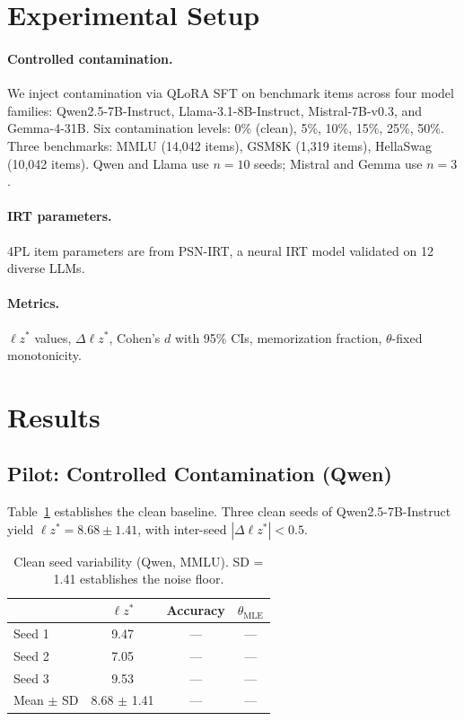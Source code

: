 \documentclass[11pt,a4paper]{article}
\begin{document}
\section{Experimental Setup}
\label{sec:setup}

\paragraph{Controlled contamination.}
We inject contamination via QLoRA SFT on benchmark items across four model families: Qwen2.5-7B-Instruct, Llama-3.1-8B-Instruct, Mistral-7B-v0.3, and Gemma-4-31B.
Six contamination levels: 0\% (clean), 5\%, 10\%, 15\%, 25\%, 50\%.
Three benchmarks: MMLU (14,042 items), GSM8K (1,319 items), HellaSwag (10,042 items).
Qwen and Llama use $n{=}10$ seeds; Mistral and Gemma use $n{=}3$.

\paragraph{IRT parameters.}
4PL item parameters are from PSN-IRT, a neural IRT model validated on 12 diverse LLMs.

\paragraph{Metrics.}
$\ell z^*$ values, $\Delta \ell z^*$, Cohen's $d$ with 95\% CIs, memorization fraction, $\theta$-fixed monotonicity.

\section{Results}
\label{sec:results}

\subsection{Pilot: Controlled Contamination (Qwen)}
\label{sec:pilot}

Table~\ref{tab:pilot_variability} establishes the clean baseline.
Three clean seeds of Qwen2.5-7B-Instruct yield $\ell z^* = 8.68 \pm 1.41$, with inter-seed $|\Delta \ell z^*| < 0.5$.

\begin{table}[h]
\centering
\small
\begin{tabular}{lccc}
\toprule
& $\ell z^*$ & Accuracy & $\theta_{\text{MLE}}$ \\
\midrule
Seed 1 & 9.47 & --- & --- \\
Seed 2 & 7.05 & --- & --- \\
Seed 3 & 9.53 & --- & --- \\
\midrule
Mean $\pm$ SD & 8.68 $\pm$ 1.41 & --- & --- \\
\bottomrule
\end{tabular}
\caption{Clean seed variability (Qwen, MMLU). SD = 1.41 establishes the noise floor.}
\label{tab:pilot_variability}
\end{table}
\end{document}
